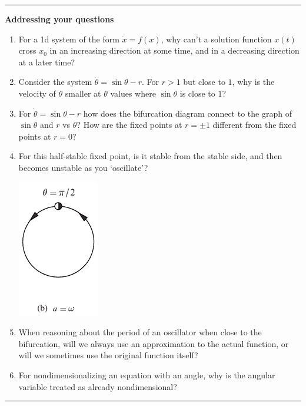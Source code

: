 \documentclass[12pt,letterpaper,noanswers]{exam}
\begin{document}
\vspace{0.2cm}

\hrule
\vspace{0.2cm}

\noindent\textbf{Addressing your questions}

\begin{enumerate}
\itemsep0em
    \item For a 1d system of the form $\dot x = f(x)$, why can't a solution function $x(t)$ cross $x_0$ in an increasing direction at some time, and in a decreasing direction at a later time?
    
\item Consider the system $\dot \theta = \sin\theta - r$.  For $r>1$ but close to $1$, why is the velocity of $\theta$ smaller at $\theta$ values where $\sin\theta$ is close to $1$?
\item For $\dot\theta = \sin\theta - r$ how does the bifurcation diagram connect to the graph of $\sin\theta$ and $r$ vs $\theta$?  How are the fixed points at $r = \pm 1$ different from the fixed points at $r = 0$?
\item For this half-stable fixed point, is it stable from the stable side, and then becomes unstable as you `oscillate'?

\includegraphics{img/C06book4-3p1.png}

\item When reasoning about the period of an oscillator when close to the bifurcation, will we always use an approximation to the actual function, or will we sometimes use the original function itself?

\item For nondimensionalizing an equation with an angle, why is the angular variable treated as already nondimensional?
\end{enumerate}


\vspace{0.2cm}
\hrule
\vspace{0.2cm}
\end{document}
